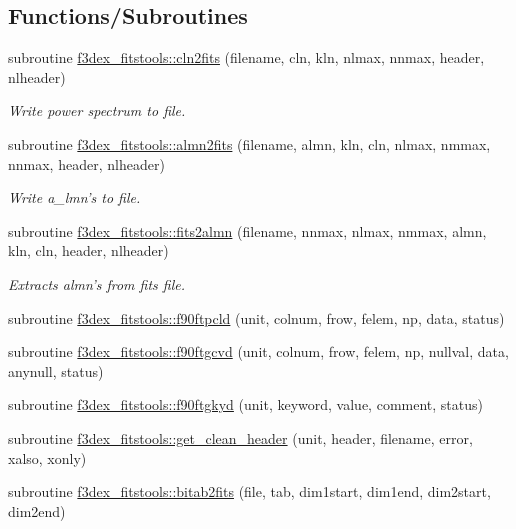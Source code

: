\subsection*{Functions/Subroutines}
\begin{DoxyCompactItemize}
\item 
subroutine \hyperlink{namespacef3dex__fitstools_aab1f14e65c2837494cb15ff4fd54b372}{f3dex\_\-fitstools::cln2fits} (filename, cln, kln, nlmax, nnmax, header, nlheader)
\begin{DoxyCompactList}\small\item\em Write power spectrum to file. \end{DoxyCompactList}\item 
subroutine \hyperlink{namespacef3dex__fitstools_a3bb8fd149a1c137d3176d484e28bbef0}{f3dex\_\-fitstools::almn2fits} (filename, almn, kln, cln, nlmax, nmmax, nnmax, header, nlheader)
\begin{DoxyCompactList}\small\item\em Write a\_\-lmn's to file. \end{DoxyCompactList}\item 
subroutine \hyperlink{namespacef3dex__fitstools_a106cd0d1eb3bcd38d2c43228f499f57b}{f3dex\_\-fitstools::fits2almn} (filename, nnmax, nlmax, nmmax, almn, kln, cln, header, nlheader)
\begin{DoxyCompactList}\small\item\em Extracts almn's from fits file. \end{DoxyCompactList}\item 
subroutine \hyperlink{namespacef3dex__fitstools_a83e1158f828e86e43f1dc68bc0e7c59b}{f3dex\_\-fitstools::f90ftpcld} (unit, colnum, frow, felem, np, data, status)
\item 
subroutine \hyperlink{namespacef3dex__fitstools_ada7b447f4ace46eabf663495c3a8c8c2}{f3dex\_\-fitstools::f90ftgcvd} (unit, colnum, frow, felem, np, nullval, data, anynull, status)
\item 
subroutine \hyperlink{namespacef3dex__fitstools_ab7baecf48bb7833c32bc7be570f947c1}{f3dex\_\-fitstools::f90ftgkyd} (unit, keyword, value, comment, status)
\item 
subroutine \hyperlink{namespacef3dex__fitstools_a0d143b6a055e5c50c19b86e75d94c663}{f3dex\_\-fitstools::get\_\-clean\_\-header} (unit, header, filename, error, xalso, xonly)
\item 
subroutine \hyperlink{namespacef3dex__fitstools_ae6aed20f64a46bb7d9d33b1c56f89cd0}{f3dex\_\-fitstools::bitab2fits} (file, tab, dim1start, dim1end, dim2start, dim2end)

\end{DoxyCompactItemize}
